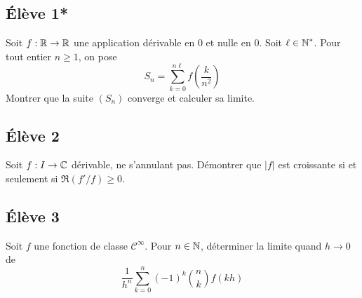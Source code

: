 \documentclass[10pt]{scrartcl}
\title{}
\author{}
\date{}
\begin{document}
    \subsection*{Élève 1*}
    \begin{exo}
        Soit $f:\operatorname{\mathbb R}\to\operatorname{\mathbb R}$ une application dérivable en $0$ et nulle en $0$. 
        Soit $\ell\in\operatorname{\mathbb N}^*$. Pour tout entier $n\geq 1$, on pose 
        \[
            S_n=\sum_{k=0}^{n\ell}f\left(\frac k{n^2}\right)
        \]
        Montrer que la suite $(S_n)$ converge et calculer sa limite.
    \end{exo}
    
    \subsection*{Élève 2}
    \begin{exo}
        Soit $f:I\to\operatorname{\mathbb C}$ dérivable, ne s'annulant pas. 
        Démontrer que $|f|$ est croissante si et seulement si 
        $\Re(f'/f)\geq 0$.
    \end{exo}

    \subsection*{Élève 3}
    \begin{exo}
        Soit $f$ une fonction de classe $\mathcal C^\infty$.
        Pour $n\in\operatorname{\mathbb N}$, déterminer la limite quand $h\to0$ de 
        \[
            \frac1{h^n}\sum_{k=0}^n(-1)^k\binom nkf(kh)
        \]
    \end{exo}
\end{document}
